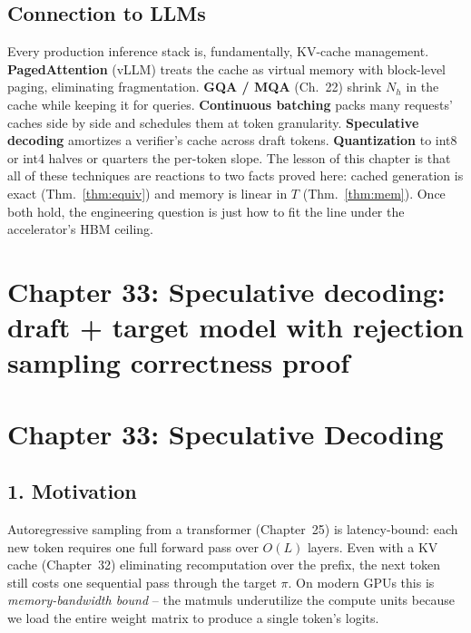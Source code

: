 \documentclass[11pt]{article}
\theoremstyle{remark}
\begin{document}
\subsection*{Connection to LLMs}

Every production inference stack is, fundamentally, KV-cache management. \textbf{PagedAttention} (vLLM) treats the cache as virtual memory with block-level paging, eliminating fragmentation. \textbf{GQA / MQA} (Ch.~22) shrink $N_h$ in the cache while keeping it for queries. \textbf{Continuous batching} packs many requests' caches side by side and schedules them at token granularity. \textbf{Speculative decoding} amortizes a verifier's cache across draft tokens. \textbf{Quantization} to int8 or int4 halves or quarters the per-token slope. The lesson of this chapter is that all of these techniques are reactions to two facts proved here: cached generation is exact (Thm.~\ref{thm:equiv}) and memory is linear in $T$ (Thm.~\ref{thm:mem}). Once both hold, the engineering question is just how to fit the line under the accelerator's HBM ceiling.


\section*{Chapter 33: Speculative decoding: draft + target model with rejection sampling correctness proof}

\section*{Chapter 33: Speculative Decoding}

\subsection*{1. Motivation}

Autoregressive sampling from a transformer (Chapter~25) is latency-bound: each new token requires one full forward pass over $O(L)$ layers. Even with a KV cache (Chapter~32) eliminating recomputation over the prefix, the next token still costs one sequential pass through the target $\pi$. On modern GPUs this is \emph{memory-bandwidth bound} -- the matmuls underutilize the compute units because we load the entire weight matrix to produce a single token's logits.
\end{document}
